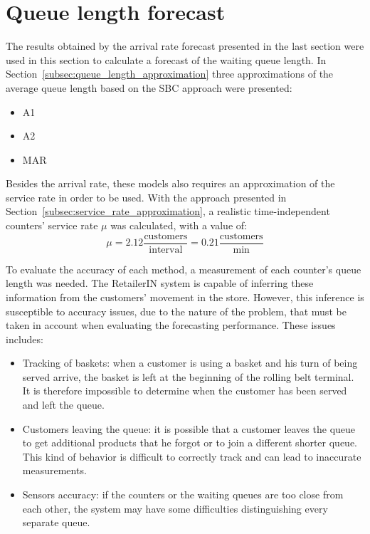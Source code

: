 \section{Queue length forecast}
\label{sec:queue_length_forecast_results}

The results obtained by the arrival rate forecast presented in the last section were used in this section to calculate a forecast of the waiting queue length. In Section~\ref{subsec:queue_length_approximation} three approximations of the average queue length based on the SBC approach were presented:
\begin{itemize}
  \item A1
  \item A2
  \item MAR
\end{itemize}

Besides the arrival rate, these models also requires an approximation of the service rate in order to be used. With the approach presented in Section~\ref{subsec:service_rate_approximation}, a realistic time-independent counters’ service rate \( \mu \) was calculated, with a value of:
\[
  \mu = 2.12 \frac{\text{customers}}{\text{interval}} = 0.21 \frac{\text{customers}}{\text{min}}
\]

To evaluate the accuracy of each method, a measurement of each counter’s queue length was needed. The RetailerIN system is capable of inferring these information from the customers’ movement in the store. However, this inference is susceptible to accuracy issues, due to the nature of the problem, that must be taken in account when evaluating the forecasting performance. These issues includes:
\begin{itemize}
  \item Tracking of baskets: when a customer is using a basket and his turn of being served arrive, the basket is left at the beginning of the rolling belt terminal. It is therefore impossible to determine when the customer has been served and left the queue.
  \item Customers leaving the queue: it is possible that a customer leaves the queue to get additional products that he forgot or to join a different shorter queue. This kind of behavior is difficult to correctly track and can lead to inaccurate measurements.
  \item Sensors accuracy: if the counters or the waiting queues are too close from each other, the system may have some difficulties distinguishing every separate queue.
\end{itemize}

